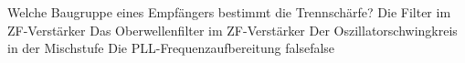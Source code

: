     {Welche Baugruppe eines Empfängers bestimmt die Trennschärfe?}
    {Die Filter im ZF-Verstärker}
    {Das Oberwellenfilter im ZF-Verstärker}
    {Der Oszillatorschwingkreis in der Mischstufe}
    {Die PLL-Frequenzaufbereitung}
    {false}{false}